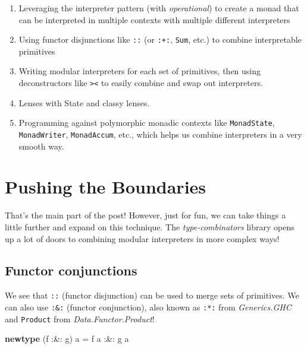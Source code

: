 \documentclass[]{article}
\newenvironment{Shaded}{}{}
\newcommand{\KeywordTok}[1]{\textcolor[rgb]{0.00,0.44,0.13}{\textbf{#1}}}
\newcommand{\NormalTok}[1]{#1}
\newcommand{\OperatorTok}[1]{\textcolor[rgb]{0.40,0.40,0.40}{#1}}
\newcommand{\OtherTok}[1]{\textcolor[rgb]{0.00,0.44,0.13}{#1}}
\begin{document}
\begin{enumerate}
\def\labelenumi{\arabic{enumi}.}
\tightlist
\item
  Leveraging the interpreter pattern (with \emph{operational}) to create a monad
  that can be interpreted in multiple contexts with multiple different
  interpreters
\item
  Using functor disjunctions like \texttt{:\textbar{}:} (or \texttt{:+:},
  \texttt{Sum}, etc.) to combine interpretable primitives
\item
  Writing modular interpreters for each set of primitives, then using
  deconstructors like \texttt{\textgreater{}\textbar{}\textless{}} to easily
  combine and swap out interpreters.
\item
  Lenses with State and classy lenses.
\item
  Programming against polymorphic monadic contexts like \texttt{MonadState},
  \texttt{MonadWriter}, \texttt{MonadAccum}, etc., which helps us combine
  interpreters in a very smooth way.
\end{enumerate}

\section{Pushing the Boundaries}\label{pushing-the-boundaries}

That's the main part of the post! However, just for fun, we can take things a
little further and expand on this technique. The \emph{type-combinators} library
opens up a lot of doors to combining modular interpreters in more complex ways!

\subsection{Functor conjunctions}\label{functor-conjunctions}

We see that \texttt{:\textbar{}:} (functor disjunction) can be used to merge
sets of primitives. We can also use \texttt{:\&:} (functor conjunction), also
known as \texttt{:*:} from \emph{Generics.GHC} and \texttt{Product} from
\emph{Data.Functor.Product}!

\begin{Shaded}
\begin{Highlighting}[]
\KeywordTok{newtype}\NormalTok{ (f }\OperatorTok{:\&:}\NormalTok{ g) a }\OtherTok{=}\NormalTok{ f a }\OperatorTok{:\&:}\NormalTok{ g a}
\end{Highlighting}
\end{Shaded}
\end{document}
